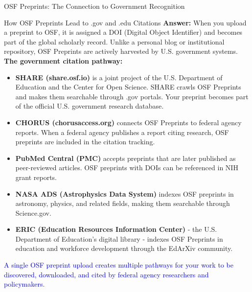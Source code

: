 \documentclass[11pt]{beamer}
\begin{document}
	\begin{frame}{OSF Preprints: The Connection to Government Recognition}
		\scriptsize
		\begin{block}{How OSF Preprints Lead to .gov and .edu Citations}
			\textbf{Answer:} When you upload a preprint to OSF, it is assigned a DOI (Digital Object Identifier) and becomes part of the global scholarly record. Unlike a personal blog or institutional repository, OSF Preprints are actively harvested by U.S. government systems.
			\vspace{0.1cm}
			\textbf{The government citation pathway:}
			\begin{itemize}
				\item \textbf{SHARE (share.osf.io)} is a joint project of the U.S. Department of Education and the Center for Open Science. SHARE crawls OSF Preprints and makes them searchable through .gov portals. Your preprint becomes part of the official U.S. government research database.
				\item \textbf{CHORUS (chorusaccess.org)} connects OSF Preprints to federal agency reports. When a federal agency publishes a report citing research, OSF preprints are included in the citation tracking.
				\item \textbf{PubMed Central (PMC)} accepts preprints that are later published as peer-reviewed articles. OSF preprints with DOIs can be referenced in NIH grant reports.
				\item \textbf{NASA ADS (Astrophysics Data System)} indexes OSF preprints in astronomy, physics, and related fields, making them searchable through Science.gov.
				\item \textbf{ERIC (Education Resources Information Center)} - the U.S. Department of Education's digital library - indexes OSF Preprints in education and workforce development through the EdArXiv community.
			\end{itemize}
			\textcolor{blue}{A single OSF preprint upload creates multiple pathways for your work to be discovered, downloaded, and cited by federal agency researchers and policymakers.}
		\end{block}
	\end{frame}
	
\end{document}
